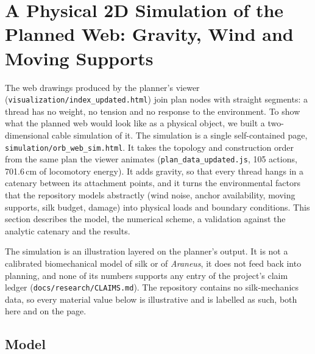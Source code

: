 \section{A Physical 2D Simulation of the Planned Web: Gravity, Wind and Moving Supports}
\label{sec:sim}

The web drawings produced by the planner's viewer (\texttt{visualization/index\_updated.html}) join plan nodes with
straight segments: a thread has no weight, no tension and no response to the environment. To show what the planned web
would look like as a physical object, we built a two-dimensional cable simulation of it. The simulation is a single
self-contained page, \texttt{simulation/orb\_web\_sim.html}. It takes the topology and construction order from the
same plan the viewer animates (\texttt{plan\_data\_updated.js}, 105 actions, 701.6\,cm of locomotory energy). It
adds gravity, so that every thread hangs in a catenary between its attachment points, and it turns the environmental
factors that the repository models abstractly (wind noise, anchor availability, moving supports, silk budget, damage)
into physical loads and boundary conditions. This section describes the model, the numerical scheme, a validation
against the analytic catenary and the results.

The simulation is an illustration layered on the planner's output. It is not a calibrated biomechanical model of silk
or of \emph{Araneus}, it does not feed back into planning, and none of its numbers supports any entry of the
project's claim ledger (\texttt{docs/research/CLAIMS.md}). The repository contains no silk-mechanics data, so every
material value below is illustrative and is labelled as such, both here and on the page.

\subsection{Model}
\label{sec:sim-model}

